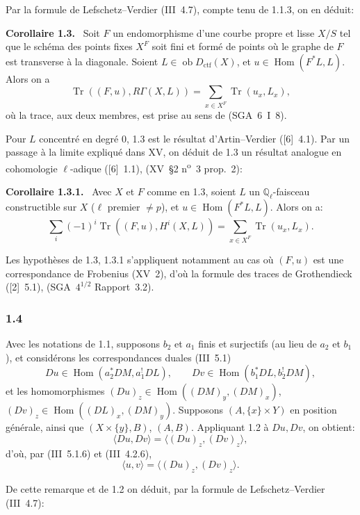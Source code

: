 \documentclass[11pt]{article}
\newenvironment{statement}[1]{\par\medskip\noindent\textbf{#1.}\ }{\par\medskip}
\DeclareMathOperator{\Hom}{Hom}
\newcommand{\ob}{\operatorname{ob}}
\providecommand{\ctf}{\mathrm{ctf}}
\providecommand{\Tr}{\operatorname{Tr}}
\begin{document}
Par la formule de Lefschetz--Verdier (III~4.7), compte tenu de 1.1.3, on en déduit:

\begin{statement}{Corollaire 1.3}
Soit $F$ un endomorphisme d'une courbe propre et lisse $X/S$ tel que le schéma des points fixes $X^F$ soit fini et formé de points où le graphe de $F$ est transverse à la diagonale. Soient $L\in\ob D_{\ctf}(X)$, et $u\in\Hom(F^*L,L)$. Alors on a
\[
\Tr((F,u),R\Gamma(X,L))=\sum_{x\in X^F}\Tr(u_x,L_x),
\]
où la trace, aux deux membres, est prise au sens de (SGA~6~I~8).
\end{statement}

Pour $L$ concentré en degré $0$, 1.3 est le résultat d'Artin--Verdier ([6]~4.1). Par un passage à la limite expliqué dans XV, on déduit de 1.3 un résultat analogue en cohomologie $\ell$-adique ([6]~1.1), (XV~\S2 n\textsuperscript{o}~3 prop.~2):

\begin{statement}{Corollaire 1.3.1}
Avec $X$ et $F$ comme en 1.3, soient $L$ un $\mathbb Q_\ell$-faisceau constructible sur $X$ ($\ell$ premier $\ne p$), et $u\in\Hom(F^*L,L)$. Alors on a:
\[
\sum_i(-1)^i\Tr((F,u),H^i(X,L))=\sum_{x\in X^F}\Tr(u_x,L_x).
\]
\end{statement}

Les hypothèses de 1.3, 1.3.1 s'appliquent notamment au cas où $(F,u)$ est une correspondance de Frobenius (XV~2), d'où la formule des traces de Grothendieck ([2]~5.1), (SGA~$4^{1/2}$ Rapport~3.2).

\subsubsection*{1.4}
Avec les notations de 1.1, supposons $b_2$ et $a_1$ finis et surjectifs (au lieu de $a_2$ et $b_1$), et considérons les correspondances duales (III~5.1)
\[
Du\in\Hom(a_2^*DM,a_1^!DL),\qquad Dv\in\Hom(b_1^*DL,b_2^!DM),
\]
et les homomorphismes $(Du)_z\in\Hom((DM)_y,(DM)_x)$, $(Dv)_z\in\Hom((DL)_x,(DM)_y)$. Supposons $(A,\{x\}\times Y)$ en position générale, ainsi que $(X\times\{y\},B)$, $(A,B)$. Appliquant 1.2 à $Du,Dv$, on obtient:
\[
\langle Du,Dv\rangle=\langle (Du)_z,(Dv)_z\rangle,
\]
d'où, par (III~5.1.6) et (III~4.2.6),
\begin{equation}\tag{1.4.1}
\langle u,v\rangle=\langle (Du)_z,(Dv)_z\rangle.
\end{equation}

De cette remarque et de 1.2 on déduit, par la formule de Lefschetz--Verdier (III~4.7):
\end{document}
